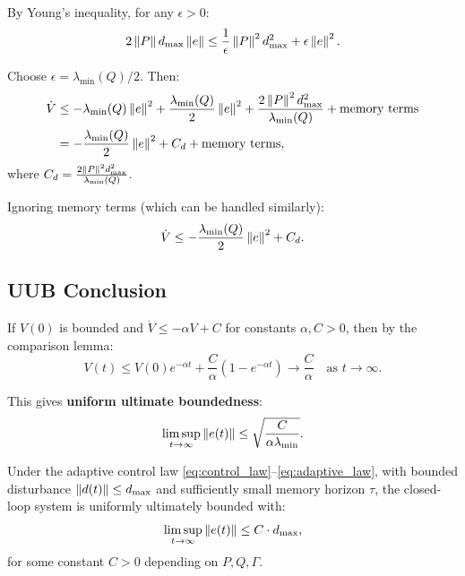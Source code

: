 By Young's inequality, for any $\epsilon > 0$:
\begin{equation}
    2 \left\| P \right\| d_{\max} \left\| e \right\| \leq \frac{1}{\epsilon} \left\| P \right\|^2 d_{\max}^2 + \epsilon \left\| e \right\|^2.
\end{equation}

Choose $\epsilon = \lambda_{\min}(Q) / 2$. Then:
\begin{align}
    \dot{V} &\leq -\lambda_{\min}(Q) \left\| e \right\|^2 + \frac{\lambda_{\min}(Q)}{2} \left\| e \right\|^2 + \frac{2 \left\| P \right\|^2 d_{\max}^2}{\lambda_{\min}(Q)} + \text{memory terms} \\
    &= -\frac{\lambda_{\min}(Q)}{2} \left\| e \right\|^2 + C_d + \text{memory terms},
\end{align}
where $C_d = \frac{2 \left\| P \right\|^2 d_{\max}^2}{\lambda_{\min}(Q)}$.

Ignoring memory terms (which can be handled similarly):
\begin{equation}
    \dot{V} \leq -\frac{\lambda_{\min}(Q)}{2} \left\| e \right\|^2 + C_d.
\end{equation}

\subsection{UUB Conclusion}

If $V(0)$ is bounded and $\dot{V} \leq -\alpha V + C$ for constants $\alpha, C > 0$, then by the comparison lemma:
\begin{equation}
    V(t) \leq V(0) e^{-\alpha t} + \frac{C}{\alpha} (1 - e^{-\alpha t}) \to \frac{C}{\alpha} \quad \text{as } t \to \infty.
\end{equation}

This gives \textbf{uniform ultimate boundedness}:
\begin{equation}
    \limsup_{t \to \infty} \left\| e(t) \right\| \leq \sqrt{\frac{C}{\alpha \lambda_{\min}}}.
\end{equation}

\begin{theorem}
\label{thm:uub}
Under the adaptive control law \eqref{eq:control_law}--\eqref{eq:adaptive_law}, with bounded disturbance $\left\| d(t) \right\| \leq d_{\max}$ and sufficiently small memory horizon $\tau$, the closed-loop system is uniformly ultimately bounded with:
\begin{equation}
    \limsup_{t \to \infty} \left\| e(t) \right\| \leq C \cdot d_{\max},
\end{equation}
for some constant $C > 0$ depending on $P, Q, \Gamma$.
\end{theorem}

